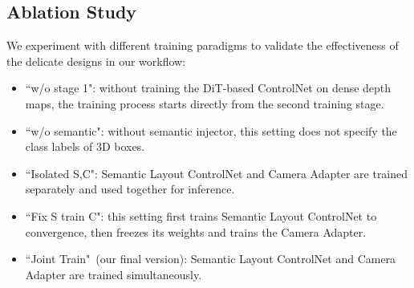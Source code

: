 \begin{table}[t]
\centering
\caption{Ablation study for training paradigms. Details of each setting are introduced in Sec~\ref{sec:ablation}. Overall, the setting of ``Joint Train"~(our final version) achieves the best performance on all metrics than other variants.}
\vspace{-4pt}
\setlength{\tabcolsep}{1.5pt}
\label{tab:ablation}
\vspace{-13pt}
\end{table}



\subsection{Ablation Study}
\label{sec:ablation}
We experiment with different training paradigms to validate the effectiveness of the delicate designs in our workflow:
\begin{itemize}
\item ``w/o stage 1": without training the DiT-based ControlNet on dense depth maps, the training process starts directly from the second training stage.
\item ``w/o semantic": without semantic injector, this setting does not specify the class labels of 3D boxes.
\item ``Isolated S,C": Semantic Layout ControlNet and Camera Adapter are trained separately and used together for inference.
\item ``Fix S train C": this setting first trains Semantic Layout ControlNet to convergence, then freezes its weights and trains the Camera Adapter. 
\item ``Joint Train"~(our final version): Semantic Layout ControlNet and Camera Adapter are trained simultaneously.
\end{itemize}



